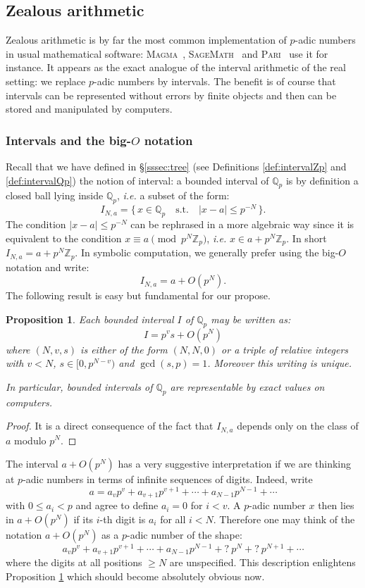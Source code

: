 \documentclass[11pt]{article}
\numberwithin{equation}{section}
\numberwithin{figure}{section}
\renewcommand{\leq}{\leqslant}
\renewcommand{\geq}{\geqslant}
\newtheorem{prop}[theo]{Proposition}
\theoremstyle{definition}
\newcommand{\Z}{\mathbb Z}
\newcommand{\Zp}{\Z_p}
\newcommand{\Q}{\mathbb Q}
\newcommand{\Qp}{\Q_p}
\newcommand{\sage}{\textsc{SageMath}~\cite{sage}\xspace}
\newcommand{\magma}{\textsc{Magma}~\cite{magma}\xspace}
\newcommand{\pari}{\textsc{Pari}~\cite{pari}\xspace}
\begin{document}
\subsection{Zealous arithmetic}
\label{ssec:zealous}

Zealous arithmetic is by far the most common implementation of 
$p$-adic numbers in usual mathematical software: \magma, \sage and 
\pari use it for instance. It appears as the exact analogue of the 
interval arithmetic of the real setting: we replace $p$-adic numbers by 
intervals. The benefit is of course that intervals can be represented 
without errors by finite objects and then can be stored and manipulated 
by computers.

\subsubsection{Intervals and the big-$O$ notation}

Recall that we have defined in \S \ref{sssec:tree} (see Definitions 
\ref{def:intervalZp} and \ref{def:intervalQp}) the notion of interval: 
a bounded interval of $\Qp$ is by definition a closed ball lying inside
$\Qp$, \emph{i.e.} a subset of the form:
$$I_{N,a} = \big\{ \, x \in \Qp 
\quad \text{s.t.} \quad 
|x - a| \leq p^{-N} \, \big\}.$$
The condition $|x - a| \leq p^{-N}$ can be rephrased in a more algebraic 
way since it is equivalent to the condition $x \equiv a \pmod{p^N \Zp}$, 
\emph{i.e.} $x \in a + p^N \Zp$. In short $I_{N,a} = a + p^N \Zp$. In 
symbolic computation, we generally prefer using the big-$O$ notation and 
write:
$$I_{N,a} = a + O(p^N).$$
The following result is easy but fundamental for our propose.

\begin{prop}
\label{prop:intervalcomputer}
Each bounded interval $I$ of $\Qp$ may be written as:
$$I = p^v s + O(p^N)$$
where $(N,v,s)$ is either of the form $(N,N,0)$ or a triple of relative 
integers with $v < N$, $s \in [0, p^{N-v})$ and $\gcd(s,p) = 1$.
Moreover this writing is unique.

In particular, bounded intervals of $\Qp$ are representable by exact
values on computers.
\end{prop}

\begin{proof}
It is a direct consequence of the fact that
$I_{N,a}$ depends only on the class of $a$ modulo $p^N$.
\end{proof}

The interval $a + O(p^N)$ 
has a very suggestive interpretation if we are thinking at $p$-adic 
numbers in terms of infinite sequences of digits.
Indeed, write 
$$a = a_v p^v + a_{v+1} p^{v+1} + \cdots + a_{N-1} p^{N-1} + \cdots$$ 
with $0 \leq a_i < p$ and agree to define $a_i = 0$ for 
$i < v$. A $p$-adic number $x$ then lies in $a + O(p^N)$ if its $i$-th 
digit is $a_i$ for all $i < N$. Therefore one may think of the notation 
$a + O(p^N)$ as a $p$-adic number of the shape:
$$a_v p^v + a_{v+1} p^{v+1} + \cdots + a_{N-1} p^{N-1} + {}?\:p^N 
+{} ?\:p^{N+1} + \cdots$$
where the digits at all positions $\geq N$ are unspecified. This 
description enlightens Proposition \ref{prop:intervalcomputer} 
which should become absolutely obvious now.
\end{document}
